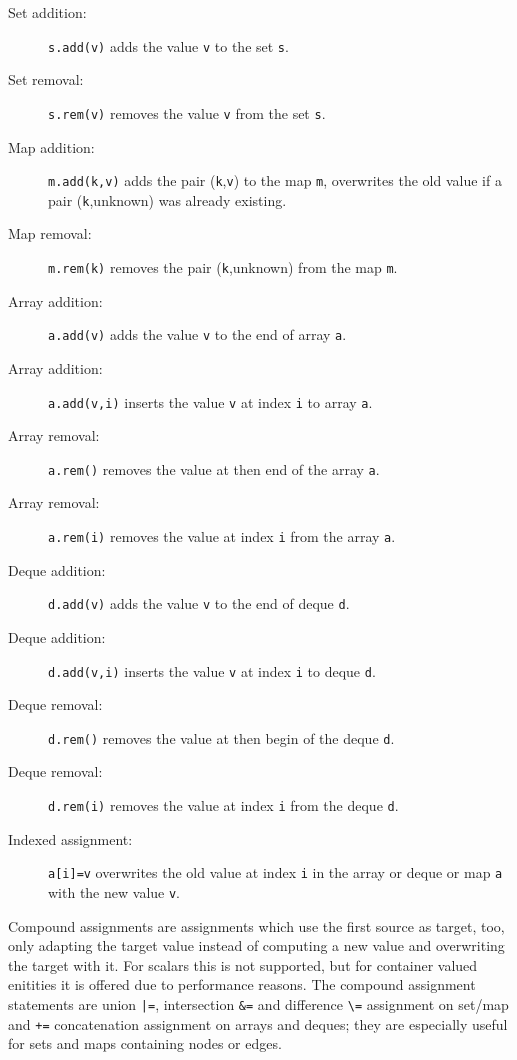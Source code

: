 \begin{description}
\item[Set addition:] \texttt{s.add(v)} adds the value \texttt{v} to the set \texttt{s}.
\item[Set removal:] \texttt{s.rem(v)} removes the value \texttt{v} from the set \texttt{s}.
\item[Map addition:] \texttt{m.add(k,v)} adds the pair (\texttt{k},\texttt{v}) to the map \texttt{m}, overwrites the old value if a pair (\texttt{k},unknown) was already existing.
\item[Map removal:] \texttt{m.rem(k)} removes the pair (\texttt{k},unknown) from the map \texttt{m}.
\item[Array addition:] \texttt{a.add(v)} adds the value \texttt{v} to the end of array \texttt{a}.
\item[Array addition:] \texttt{a.add(v,i)} inserts the value \texttt{v} at index \texttt{i} to array \texttt{a}.
\item[Array removal:] \texttt{a.rem()} removes the value at then end of the array \texttt{a}.
\item[Array removal:] \texttt{a.rem(i)} removes the value at index \texttt{i} from the array \texttt{a}.
\item[Deque addition:] \texttt{d.add(v)} adds the value \texttt{v} to the end of deque \texttt{d}.
\item[Deque addition:] \texttt{d.add(v,i)} inserts the value \texttt{v} at index \texttt{i} to deque \texttt{d}.
\item[Deque removal:] \texttt{d.rem()} removes the value at then begin of the deque \texttt{d}.
\item[Deque removal:] \texttt{d.rem(i)} removes the value at index \texttt{i} from the deque \texttt{d}.
\item[Indexed assignment:] \texttt{a[i]=v} overwrites the old value at index \texttt{i} in the array or deque or map \texttt{a} with the new value \texttt{v}.
\end{description}


Compound assignments are assignments which use the first source as target, too,
only adapting the target value instead of computing a new value and overwriting the target with it.
For scalars this is not supported, but for container valued enitities it is offered due to performance reasons.
The compound assignment statements are union \verb#|=#, intersection \verb#&=# and difference \verb#\=# assignment on set/map and \verb#+=# concatenation assignment on arrays and deques; they are especially useful for sets and maps containing nodes or edges.

